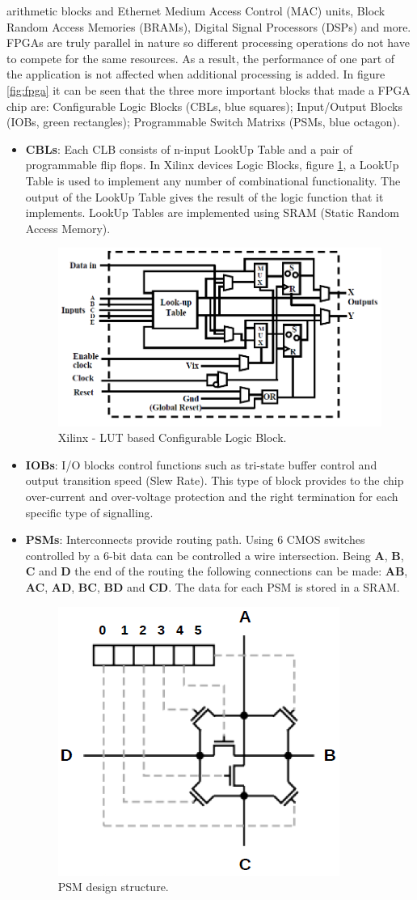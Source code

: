 arithmetic blocks and Ethernet Medium Access Control (MAC) units, Block Random Access Memories (BRAMs), Digital Signal Processors (DSPs) and more.
\\
FPGAs are truly parallel in nature so different processing operations do not have to compete for the same resources. As a result, the performance of one part of the application is not affected when additional processing is added.
\newline
\noindent In figure \ref{fig:fpga} it can be seen that the three more important blocks that made a FPGA chip are: Configurable Logic Blocks (CBLs, blue squares); Input/Output Blocks (IOBs, green rectangles); Programmable Switch Matrixs (PSMs, blue octagon).
\begin{itemize}
	\item \textbf{CBLs}: Each CLB consists of n-input LookUp Table and a pair of programmable flip flops. In Xilinx devices Logic Blocks, figure \ref{fig:clb}, a LookUp Table is used to implement any number of combinational functionality. The output of the LookUp Table gives the result of the logic function that it implements. LookUp Tables are implemented using SRAM (Static Random Access Memory).
	\begin{figure}[H]
		\centering
		\includegraphics[width=0.7\linewidth]{IMG/ch3/CLB}
		\caption{Xilinx - LUT based Configurable Logic Block.}
		\label{fig:clb}
	\end{figure}
	\item \textbf{IOBs}: I/O blocks control functions such as tri-state buffer control and output transition speed (Slew Rate).
	This type of block provides to the chip over-current and over-voltage protection and the right termination for each specific type of signalling.
	\item \textbf{PSMs}: Interconnects provide routing path. Using 6 CMOS switches controlled by a 6-bit data can be controlled a  wire intersection. Being \textbf{A}, \textbf{B}, \textbf{C} and \textbf{D} the  end of the routing the following connections can be made: \textbf{AB}, \textbf{AC}, \textbf{AD}, \textbf{BC}, \textbf{BD} and \textbf{CD}.
	The data for each PSM is stored in a SRAM.
	\begin{figure}[H]
		\centering
		\includegraphics[width=0.25\linewidth]{IMG/ch3/PSM}
		\caption{PSM design structure.}
		\label{fig:psm}
	\end{figure}
\end{itemize}
